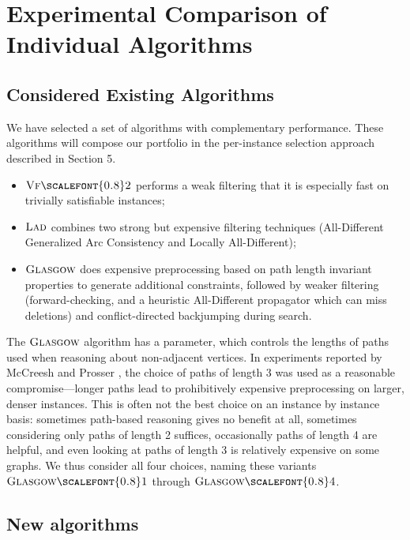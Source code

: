 \documentclass{llncs}
\newcommand{\VFtwo}{$\textsc{Vf{\scalefont{0.8}2}}$\xspace}
\newcommand{\Glasgow}{$\textsc{Glasgow}$\xspace}
\newcommand{\LAD}{$\textsc{Lad}$\xspace}
\newcommand{\GlasgowOne}{$\textsc{Glasgow{\scalefont{0.8}1}}$\xspace}
\newcommand{\GlasgowFour}{$\textsc{Glasgow{\scalefont{0.8}4}}$\xspace}
\begin{document}
\section{Experimental Comparison of Individual Algorithms}\label{sec:exps}

\subsection{Considered Existing Algorithms}

We have selected a set of algorithms with complementary performance. These algorithms will compose our portfolio in the per-instance selection approach described in Section 5. 
\begin{itemize}
\item \VFtwo \cite{Cordella:2004} performs a weak filtering that it is especially fast on
    trivially satisfiable instances;
\item \LAD \cite{Solnon:2010} combines two strong but expensive filtering techniques
    (All-Different Generalized Arc Consistency and Locally All-Different);
\item \Glasgow \cite{McCreesh:2015} does expensive preprocessing based on path length
    invariant properties to generate additional constraints, followed by weaker filtering
    (forward-checking, and a heuristic All-Different propagator which can miss deletions) and
    conflict-directed backjumping during search.
\end{itemize}

\noindent The \Glasgow algorithm has a parameter, which controls the lengths of paths used when
reasoning about non-adjacent vertices.  In experiments reported by McCreesh and Prosser
\cite{McCreesh:2015}, the choice of paths of length 3 was used as a reasonable compromise---longer
paths lead to prohibitively expensive preprocessing on larger, denser instances. This is often not
the best choice on an instance by instance basis: sometimes path-based reasoning gives no benefit at
all, sometimes considering only paths of length 2 suffices, occasionally paths of length 4 are
helpful, and even looking at paths of length 3 is relatively expensive on some graphs. We thus consider all
four choices, naming these variants \GlasgowOne through \GlasgowFour.

\subsection{New algorithms}
\end{document}
